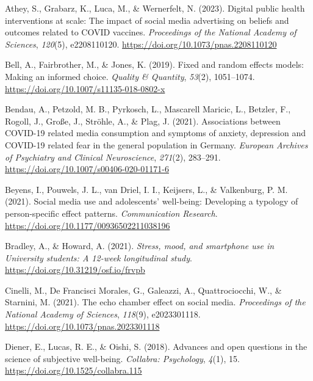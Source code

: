 \documentclass[
  man,mask,floatsintext]{apa7}
\newlength{\cslhangindent}
\newlength{\cslentryspacingunit} %
\newenvironment{CSLReferences}[2] %
 {%
  \setlength{\parindent}{0pt}
  \ifodd #1
  \let\oldpar\par
  \def\par{\hangindent=\cslhangindent\oldpar}
  \fi
  \setlength{\parskip}{#2\cslentryspacingunit}
 }%
 {}
\begin{document}
\hypertarget{refs}{}
\begin{CSLReferences}{1}{0}
\leavevmode{}%
Athey, S., Grabarz, K., Luca, M., \& Wernerfelt, N. (2023). Digital public health interventions at scale: {The} impact of social media advertising on beliefs and outcomes related to {COVID} vaccines. \emph{Proceedings of the National Academy of Sciences}, \emph{120}(5), e2208110120. \url{https://doi.org/10.1073/pnas.2208110120}

\leavevmode{}%
Bell, A., Fairbrother, M., \& Jones, K. (2019). Fixed and random effects models: Making an informed choice. \emph{Quality \& Quantity}, \emph{53}(2), 1051--1074. \url{https://doi.org/10.1007/s11135-018-0802-x}

\leavevmode{}%
Bendau, A., Petzold, M. B., Pyrkosch, L., Mascarell Maricic, L., Betzler, F., Rogoll, J., Große, J., Ströhle, A., \& Plag, J. (2021). Associations between {COVID-19} related media consumption and symptoms of anxiety, depression and {COVID-19} related fear in the general population in {Germany}. \emph{European Archives of Psychiatry and Clinical Neuroscience}, \emph{271}(2), 283--291. \url{https://doi.org/10.1007/s00406-020-01171-6}

\leavevmode{}%
Beyens, I., Pouwels, J. L., van Driel, I. I., Keijsers, L., \& Valkenburg, P. M. (2021). Social media use and adolescents' well-being: {Developing} a typology of person-specific effect patterns. \emph{Communication Research}. \url{https://doi.org/10.1177/00936502211038196}

\leavevmode{}%
Bradley, A., \& Howard, A. (2021). \emph{Stress, mood, and smartphone use in {University} students: {A} 12-week longitudinal study}. \url{https://doi.org/10.31219/osf.io/frvpb}

\leavevmode{}%
Cinelli, M., De Francisci Morales, G., Galeazzi, A., Quattrociocchi, W., \& Starnini, M. (2021). The echo chamber effect on social media. \emph{Proceedings of the National Academy of Sciences}, \emph{118}(9), e2023301118. \url{https://doi.org/10.1073/pnas.2023301118}

\leavevmode{}%
Diener, E., Lucas, R. E., \& Oishi, S. (2018). Advances and open questions in the science of subjective well-being. \emph{Collabra: Psychology}, \emph{4}(1), 15. \url{https://doi.org/10.1525/collabra.115}


\end{CSLReferences}
\end{document}
